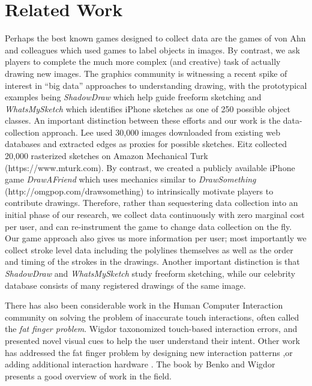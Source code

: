\section{Related Work}

Perhaps the best known games designed to collect data are the games of von Ahn and colleagues  which used games to label objects in images. By contrast, we ask players to complete the much more complex (and creative) task of actually drawing new images. The graphics community is witnessing a recent spike of interest in ``big data'' approaches to understanding drawing, with the prototypical examples being \emph{ShadowDraw} \cite{Lee:2011} which help guide freeform sketching and \emph{WhatsMySketch} \cite{Eitz:2012:HSO} which identifies iPhone sketches as one of 250 possible object classes. An important distinction between these efforts and our work is the data-collection approach. Lee \etal used 30,000 images downloaded from existing web databases and extracted edges as proxies for possible sketches. Eitz \etal collected 20,000 rasterized sketches on Amazon Mechanical Turk (https://www.mturk.com). By contrast, we created a publicly available iPhone game \emph{DrawAFriend} which uses mechanics similar to \emph{DrawSomething} (http://omgpop.com/drawsomething) to intrinsically motivate players to contribute drawings. Therefore, rather than sequestering data collection into an initial phase of our research, we collect data continuously with zero marginal cost per user, and can re-instrument the game to change data collection on the fly. Our game approach also gives us more information per user; most importantly we collect stroke level data including the polylines themselves as well as the order and timing of the strokes in the drawings. Another important distinction is that \emph{ShadowDraw} and \emph{WhatsMySketch} study freeform sketching, while our celebrity database consists of many registered drawings of the same image.

There has also been considerable work in the Human Computer Interaction community on solving the problem of inaccurate touch interactions, often called the \emph{fat finger problem}. Wigdor \etal {} taxonomized touch-based interaction errors, and presented novel visual cues to help the user understand their intent. Other work has addressed the fat finger problem by designing new interaction patterns \cite{Albinsson:2003:HPT,Benko:2006:PST,Forlines06hybridpointing,Vogel07shift:a},or adding additional interaction hardware \cite{Scott:2010:RTE,Wigdor:2006:UTI,Wigdor:2007:LTS}. The book by Benko and Wigdor  presents a good overview of work in the field.

